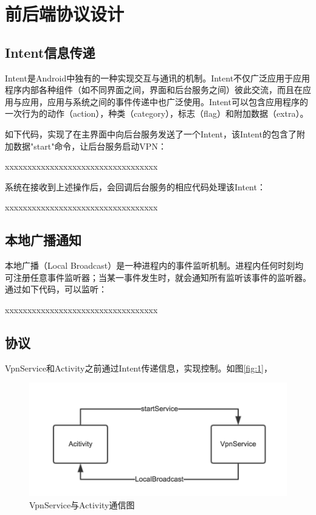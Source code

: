 \documentclass[format=final, language=chinese, degree=bachelor]{hustthesis}
\begin{document}
\section{前后端协议设计}

\subsection{Intent信息传递}

Intent是Android中独有的一种实现交互与通讯的机制。Intent不仅广泛应用于应用程序内部各种组件（如不同界面之间，界面和后台服务之间）彼此交流，而且在应用与应用，应用与系统之间的事件传递中也广泛使用。Intent可以包含应用程序的一次行为的动作（action），种类（category），标志（flag）和附加数据（extra）。

如下代码，实现了在主界面中向后台服务发送了一个Intent，该Intent的包含了附加数据"start"命令，让后台服务启动VPN：

    xxxxxxxxxxxxxxxxxxxxxxxxxxxxxxxxxx

系统在接收到上述操作后，会回调后台服务的相应代码处理该Intent：

    xxxxxxxxxxxxxxxxxxxxxxxxxxxxxxxxxx

\subsection{本地广播通知}

本地广播（Local Broadcast）是一种进程内的事件监听机制。进程内任何时刻均可注册任意事件监听器；当某一事件发生时，就会通知所有监听该事件的监听器。通过如下代码，可以监听：


    xxxxxxxxxxxxxxxxxxxxxxxxxxxxxxxxxx


\subsection{协议}

VpnService和Activity之前通过Intent传递信息，实现控制。如图\autoref{fig:1}，

\begin{figure}[h!]
\centering
\includegraphics[width=.8\textwidth]{image_intent_commuciate.png}
\caption{VpnService与Activity通信图}\label{fig:1}
\end{figure}
\end{document}
